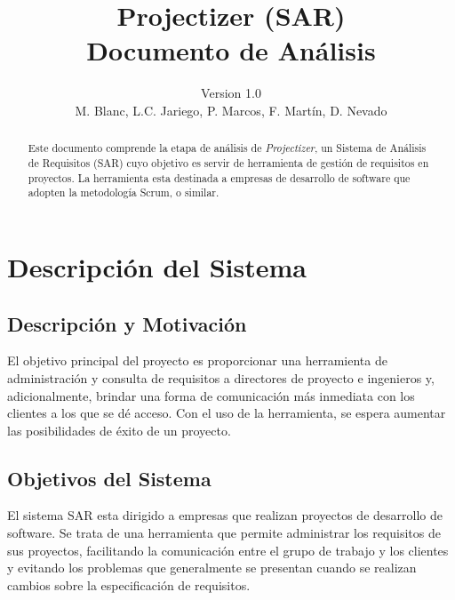 \documentclass[a4paper, spanish]{article}
\title{Projectizer (SAR)\\ Documento de Análisis}
\author{Version 1.0 \\ M. Blanc, L.C. Jariego, P. Marcos, F. Martín, D. Nevado}
\begin{document}
\maketitle
\begin{abstract}
Este documento comprende la etapa de análisis de \textit{Projectizer}, un Sistema de Análisis de Requisitos (SAR) cuyo objetivo es servir de herramienta de gestión de requisitos en proyectos. La herramienta esta destinada a empresas de desarrollo de software que adopten la metodología Scrum, o similar.
\end{abstract}
\vspace{\fill}
\tableofcontents
\let\oldsection\section\renewcommand\section{\clearpage\oldsection}

\section{Descripción del Sistema}
\subsection{Descripción y Motivación}
El objetivo principal del proyecto es proporcionar una herramienta de administración y consulta de requisitos a directores de proyecto e ingenieros y, adicionalmente, brindar una forma de comunicación más inmediata con los clientes a los que se dé acceso.
Con el uso de la herramienta, se espera aumentar las posibilidades de éxito de un proyecto.


\subsection{Objetivos del Sistema}
El sistema SAR esta dirigido a empresas que realizan proyectos de desarrollo de
software. Se trata de una herramienta que permite administrar los requisitos
de sus proyectos, facilitando la comunicación entre el grupo de trabajo y los
clientes y evitando los problemas que generalmente se presentan cuando se realizan
cambios sobre la especificación de requisitos.
\end{document}
